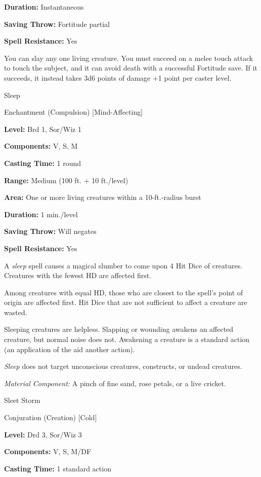 \documentclass{article}
\begin{document}
\textbf{Duration:} Instantaneous

\textbf{Saving Throw:} Fortitude partial

\textbf{Spell Resistance:} Yes

You can slay any one living creature. You must succeed on a melee touch attack 
to touch the subject, and it can avoid death with a successful Fortitude save. 
If it succeeds, it instead takes 3d6 points of damage +1 point per caster level.

\vspace{12pt}
Sleep

Enchantment (Compulsion) [Mind-Affecting]

\textbf{Level:} Brd 1, Sor/Wiz 1

\textbf{Components:} V, S, M

\textbf{Casting Time:} 1 round

\textbf{Range: }Medium (100 ft. + 10 ft./level)

\textbf{Area:} One or more living creatures within a 10-ft.-radius burst

\textbf{Duration:} 1 min./level

\textbf{Saving Throw: }Will negates

\textbf{Spell Resistance:} Yes

A \textit{sleep }spell causes a magical slumber to come upon 4 Hit Dice of creatures. 
Creatures with the fewest HD are affected first.

Among creatures with equal HD, those who are closest to the spell's point of origin 
are affected first. Hit Dice that are not sufficient to affect a creature are wasted.

Sleeping creatures are helpless. Slapping or wounding awakens an affected creature, 
but normal noise does not. Awakening a creature is a standard action (an application 
of the aid another action).

\textit{Sleep }does not target unconscious creatures, constructs, or undead creatures.

\textit{Material Component: }A pinch of fine sand, rose petals, or a live cricket.

\vspace{12pt}
Sleet Storm

Conjuration (Creation) [Cold]

\textbf{Level:} Drd 3, Sor/Wiz 3

\textbf{Components:} V, S, M/DF

\textbf{Casting Time:} 1 standard action
\end{document}
